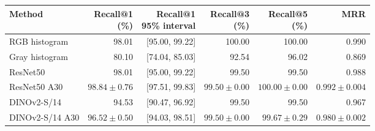 \begin{tabularx}{\linewidth}{@{}Xrrrrr@{}}
\toprule
Method & \makecell{Recall@1\\(\%)} & \makecell{Recall@1\\95\% interval} & \makecell{Recall@3\\(\%)} & \makecell{Recall@5\\(\%)} & MRR \\
\midrule
RGB histogram & 98.01 & [95.00, 99.22] & 100.00 & 100.00 & 0.990 \\
Gray histogram & 80.10 & [74.04, 85.03] & 92.54 & 96.02 & 0.869 \\
ResNet50 & 98.01 & [95.00, 99.22] & 99.50 & 99.50 & 0.988 \\
ResNet50 A30 & $98.84\pm0.76$ & [97.51, 99.83] & $99.50\pm0.00$ & $100.00\pm0.00$ & $0.992\pm0.004$ \\
DINOv2-S/14 & 94.53 & [90.47, 96.92] & 99.50 & 99.50 & 0.967 \\
DINOv2-S/14 A30 & $96.52\pm0.50$ & [94.03, 98.51] & $99.50\pm0.00$ & $99.67\pm0.29$ & $0.980\pm0.002$ \\
\bottomrule
\end{tabularx}
